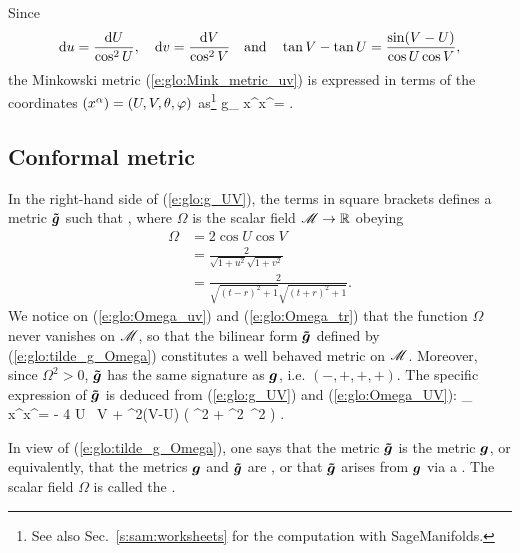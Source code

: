 Since
\[
    \mathrm{d} u = \frac{\mathrm{d} U}{\cos^2 U}, \quad \mathrm{d} v = \frac{\mathrm{d} V}{\cos^2 V}
    \quad\mbox{and}\quad
    \tan V - \tan U = \frac{\sin(V-U)}{\cos U \cos V},
\]
the Minkowski metric (\ref{e:glo:Mink_metric_uv})
is expressed in terms of the coordinates $(x^\alpha)=(U,V,\theta,\varphi)$
as\footnote{See also Sec.~\ref{s:sam:worksheets} for the computation
with SageManifolds.}
\be \label{e:glo:g_UV}
    g_{\mu\nu} \D x^\mu \D x^\nu = 
     .
\ee

\subsection{Conformal metric}

In the right-hand side of (\ref{e:glo:g_UV}),
the terms in square brackets defines a metric
$\bm{\tilde{g}}$ such that
\be \label{e:glo:tilde_g_Omega}
     ,
\ee
where $\Omega$ is the scalar field $\mathscr{M} \rightarrow \mathbb{R}$ obeying
\begin{subequations}
\begin{align}
    \Omega & =  2 \cos U \cos V \label{e:glo:Omega_UV} \\
           & =  \frac{2}{\sqrt{1+u^2}\sqrt{1+v^2}} \label{e:glo:Omega_uv}\\
           & =  \frac{2}{\sqrt{(t-r)^2+1}\sqrt{(t+r)^2+1}} . \label{e:glo:Omega_tr}
\end{align}
\end{subequations}
We notice on (\ref{e:glo:Omega_uv}) and (\ref{e:glo:Omega_tr}) that the function
$\Omega$ never vanishes on $\mathscr{M}$, so that the bilinear form $\bm{\tilde{g}}$ defined by
(\ref{e:glo:tilde_g_Omega}) constitutes a well behaved metric on $\mathscr{M}$.
Moreover, since $\Omega^2 > 0$, $\bm{\tilde{g}}$ has the same signature as
$\bm{g}$, i.e. $(-,+,+,+)$.
The specific expression of $\bm{\tilde{g}}$ is deduced from (\ref{e:glo:g_UV})
and (\ref{e:glo:Omega_UV}):
\be \label{e:glo:tg_UV}
    _{\mu\nu} \D x^\mu \D x^\nu =  - 4 \D U \, \D V
        + \sin^2(V-U) \left(  \D\th^2 + \sin^2\th \, \D\ph^2 \right) .
\ee

In view of (\ref{e:glo:tilde_g_Omega}), one says that the metric $\bm{\tilde{g}}$
is  the metric $\bm{g}$, or equivalently,
that the metrics $\bm{g}$ and $\bm{\tilde{g}}$ are
,
or that $\bm{\tilde{g}}$ arises from $\bm{g}$ via a
.
The scalar field $\Omega$ is called the .

